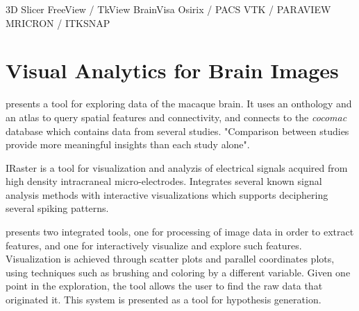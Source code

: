 3D Slicer
FreeView / TkView
BrainVisa
Osirix / PACS 
VTK / PARAVIEW
MRICRON / ITKSNAP









\section{Visual Analytics for Brain Images}

\autocite{bezgin_matching_2009} presents a tool for exploring data of the macaque brain. It uses an onthology and an atlas to query spatial features and connectivity, and connects to the \emph{cocomac} database which contains data from several studies. "Comparison between studies provide more meaningful insights than each study alone".

IRaster \autocite{somerville_iraster:_2010}  is a tool for visualization and analyzis of electrical signals acquired from high density intracraneal micro-electrodes. Integrates several known signal analysis methods with interactive visualizations which supports deciphering several spiking patterns.

\autocite{steenwijk_integrated_2010} presents two integrated tools, one for processing of image data in order to extract features, and one for interactively visualize and explore such features. Visualization is achieved through scatter plots and parallel coordinates plots, using techniques such as brushing and coloring by a different variable.  Given one point in the exploration, the tool allows the user to find the raw data that originated it. This system is presented as a tool for hypothesis generation. 

